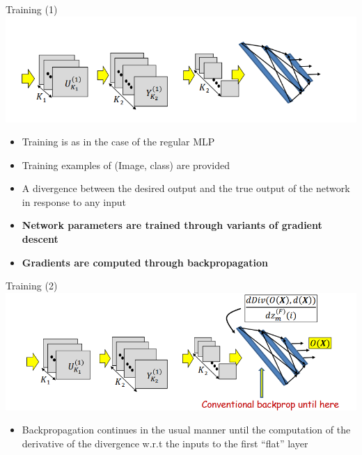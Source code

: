 \documentclass[serif, aspectratio=169]{beamer}
\begin{document}
	\begin{frame}{Training (1)}
		\centering
		\includegraphics[keepaspectratio, scale=0.6]{pic/training.png}
		\smallskip
		\begin{itemize}
			\item Training is as in the case of the regular MLP
			\item Training examples of (Image, class) are provided
			\item A divergence between the desired output and the true output of the network in response to any input
			\item \textbf{Network parameters are trained through variants of gradient descent}
			\item \textbf{Gradients are computed through backpropagation}
		\end{itemize}
	\end{frame}
	\begin{frame}{Training (2)}
		\centering
		\includegraphics[keepaspectratio, scale=0.6]{pic/training1.png}
		\smallskip
		\begin{itemize}
			\item Backpropagation continues in the usual manner until the computation of the derivative of the divergence w.r.t the inputs to the first ``flat'' layer
		\end{itemize}
		
	\end{frame}
\end{document}
